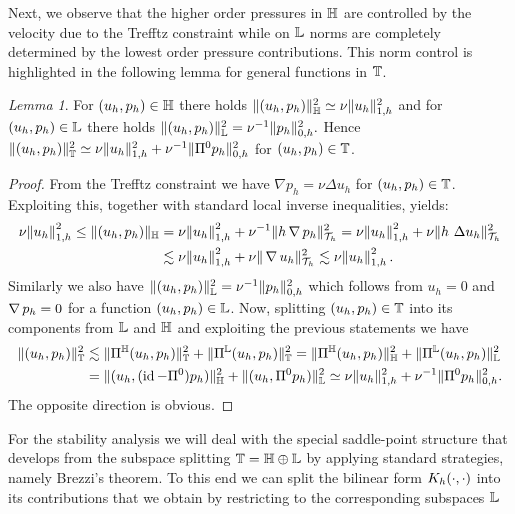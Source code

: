\documentclass[sn-mathphys,Numbered]{sn-jnl}%
\theoremstyle{remark}%
\newtheorem{lemma}[theorem]{Lemma}
\theoremstyle{definition}%
\begin{document}
Next, we observe that the higher order pressures in $\mathbb{H}$ are controlled by the velocity
due to the Trefftz constraint while on $\mathbb{L}$ norms are completely determined by
the lowest order pressure contributions. 
This norm control is highlighted in the following lemma for general functions in $\mathbb{T}$.
\begin{lemma}\label{lem:normeq}
  For $(u_h,p_h) \in \mathbb{H}$ there holds
  $
  \Vert (u_h,p_h) \Vert_{\mathbb{H}}^2 \simeq \nu \Vert u_h \Vert_{1,h}^2
  $
  and for $(u_h,p_h) \in \mathbb{L}$ there holds
  $
  \Vert (u_h,p_h) \Vert_{\mathbb{L}}^2 = \nu^{-1} \Vert p_h \Vert_{0,h}^2. 
  $
  Hence $\Vert (u_h,p_h) \Vert_{\mathbb{T}}^2 \simeq \nu \Vert u_h \Vert_{1,h}^2 + \nu^{-1} \Vert \Pi^0 p_h \Vert_{0,h}^2$
  for $(u_h,p_h) \in \mathbb{T}$. 
\end{lemma}
\begin{proof}
  From the Trefftz constraint we have $\nabla p_h = \nu \Delta u_h$ for $(u_h,p_h)
  \in \mathbb{T}$. Exploiting this, together with standard local inverse inequalities, yields:
  \begin{align*}
    \nu \norm{u_h}_{1,h}^2 \leq \Vert (u_h,p_h) \Vert_{\mathbb{H}} & = \nu \norm{u_h}_{1,h}^2 + \nu^{-1} \Vert h \operatorname{\nabla} p_h \Vert_{{\mathcal{T}_h}}^2 = \nu \norm{u_h}_{1,h}^2 + \nu \Vert h \ \Delta u_h \Vert_{{\mathcal{T}_h}}^2 \\
    & \lesssim \nu \norm{u_h}_{1,h}^2 +  \nu \Vert \operatorname{\nabla} u_h \Vert_{{\mathcal{T}_h}}^2 \lesssim \nu \norm{u_h}_{1,h}^2. 
  \end{align*}
  Similarly we also have $\Vert (u_h,p_h) \Vert_{\mathbb{L}}^2 = \nu^{-1} \Vert p_h \Vert_{0,h}^2$ which follows from
  $u_h=0$ and $\operatorname{\nabla} p_h = 0$ for a function $(u_h,p_h) \in \mathbb{L}$. Now, splitting $(u_h,p_h) \in \mathbb{T}$ into its components from
  $\mathbb{L}$  and $\mathbb{H}$ and exploiting the previous statements we have
  \begin{align*}
    \Vert (u_h,p_h) \Vert_{\mathbb{T}}^2
    & \lesssim \Vert \Pi^{\mathbb{H}}(u_h,p_h) \Vert_{\mathbb{T}}^2 +   \Vert \Pi^{\mathbb{L}}(u_h,p_h) \Vert_{\mathbb{T}}^2
    = \Vert \Pi^{\mathbb{H}}(u_h,p_h) \Vert_{\mathbb{H}}^2 +   \Vert \Pi^{\mathbb{L}}(u_h,p_h) \Vert_{\mathbb{L}}^2 \\
    & = \Vert (u_h,(\operatorname{id} - \Pi^0)p_h) \Vert_{\mathbb{H}}^2 + \Vert (u_h, \Pi^0 p_h) \Vert_{\mathbb{L}}^2
    \simeq \nu \Vert u_h \Vert_{1,h}^2 + \nu^{-1} \Vert \Pi^0 p_h \Vert_{0,h}^2.
  \end{align*}
  The opposite direction is obvious.
\end{proof}
For the stability analysis we will deal with the special saddle-point structure 
that develops from the subspace splitting $\mathbb{T} = \mathbb{H} \oplus \mathbb{L}$ by applying standard strategies, namely Brezzi's theorem.
To this end we can split the bilinear form $K_h(\cdot,\cdot)$ into its
contributions that we obtain by restricting to the corresponding subspaces $\mathbb{L}$
\end{document}
